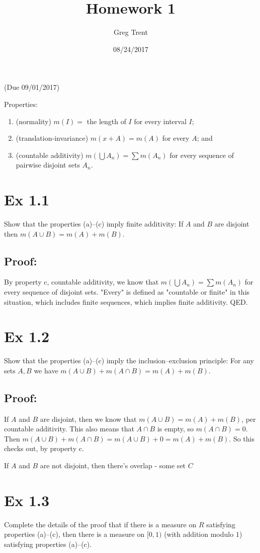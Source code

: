 \documentclass{article}
\author{Greg Trent}
\title{Homework 1}
\date{08/24/2017}
\begin{document}
\maketitle
(Due 09/01/2017)

Properties:
\begin{enumerate}
\item (normality) $m(I)=$ the length of $I$ for every interval $I$;
\item (translation-invariance) $m(x+A)=m(A)$ for every $A$; and
\item (countable additivity) $m(\bigcup A_n)=\sum m(A_n)$ for every sequence of pairwise disjoint sets $A_n$.
\end{enumerate}

\section{Ex 1.1}
  Show that the properties (a)--(c) imply finite additivity: If $A$ and $B$ are disjoint then $m(A\cup B)=m(A)+m(B)$.

\subsection{Proof:}
By property c, countable additivity, we know that $m(\bigcup A_n)=\sum m(A_n)$ for every sequence of disjoint sets. "Every" is defined as "countable or finite" in this situation, which includes finite sequences, which implies finite additivity. QED. 

\section{Ex 1.2}
  Show that the properties (a)--(c) imply the inclusion--exclusion principle: For any sets $A,B$ we have $m(A\cup B)+m(A\cap B)=m(A)+m(B)$.

\subsection{Proof:}
If $A$ and $B$ are disjoint, then we know that $m(A \cup B) = m(A) + m(B)$, per countable additivity. This also means that $A \cap B$ is empty, so $m(A \cap B) = 0$. Then $m(A \cup B) + m(A \cap B) = m(A \cup B) + 0 = m(A) + m(B)$. So this checks out, by property c.  

If $A$ and $B$ are not disjoint, then there's overlap - some set $C$
\section{Ex 1.3}
  Complete the details of the proof that if there is a measure on $R$ satisfying properties (a)--(c), then there is a measure on $[0,1)$ (with addition modulo $1$) satisfying properties (a)--(c).
\end{document}
